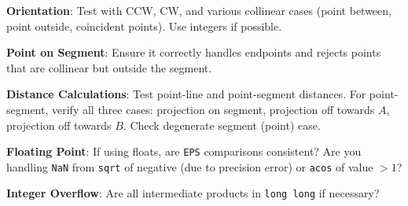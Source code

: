 \begin{debugchecklist}
\label{debug:A.4.1.checklist}
    \item \textbf{Orientation}: Test with CCW, CW, and various collinear cases (point between, point outside, coincident points). Use integers if possible.
    \item \textbf{Point on Segment}: Ensure it correctly handles endpoints and rejects points that are collinear but outside the segment.
    \item \textbf{Distance Calculations}: Test point-line and point-segment distances. For point-segment, verify all three cases: projection on segment, projection off towards $A$, projection off towards $B$. Check degenerate segment (point) case.
    \item \textbf{Floating Point}: If using floats, are \texttt{EPS} comparisons consistent? Are you handling \texttt{NaN} from \texttt{sqrt} of negative (due to precision error) or \texttt{acos} of value $>1$?
    \item \textbf{Integer Overflow}: Are all intermediate products in \texttt{long long} if necessary?
\end{debugchecklist}